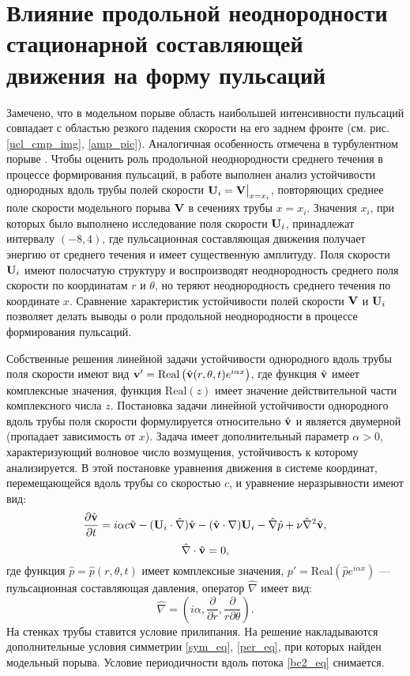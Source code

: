 \section{Влияние продольной неоднородности стационарной составляющей движения на форму пульсаций}

Замечено, что в модельном порыве область наибольшей интенсивности пульсаций совпадает с областью резкого падения скорости на его заднем фронте (см. рис. \ref{ucl_cmp_img}, \ref{amp_pic}). Аналогичная особенность отмечена в турбулентном порыве \cite{Hof2010}. Чтобы оценить роль продольной неоднородности среднего течения в процессе формирования пульсаций, в работе выполнен анализ устойчивости однородных вдоль трубы полей скорости $\mathbf{U}_i = \mathbf{V}\big|_{x=x_i}$, повторяющих среднее поле скорости модельного порыва $\mathbf{V}$ в сечениях трубы $x = x_i$. Значения $x_i$, при которых было выполнено исследование поля скорости $\mathbf{U}_i$, принадлежат интервалу $(-8,4)$, где пульсационная составляющая движения получает энергию от среднего течения и имеет существенную амплитуду. Поля скорости $\mathbf{U}_i$ имеют полосчатую структуру и воспроизводят неоднородность среднего поля скорости по координатам $r$ и $\theta$, но теряют неоднородность среднего течения по координате $x$. Сравнение характеристик устойчивости полей скорости $\mathbf{V}$ и $\mathbf{U}_i$ позволяет делать выводы о роли продольной неоднородности в процессе формирования пульсаций. 

Собственные решения линейной задачи устойчивости однородного вдоль трубы поля скорости имеют вид $\mathbf{v}' = \mathrm{Real}\left(\hat {\mathbf{v}} (r, \theta, t) e^{i \alpha x}\right)$, где функция $\hat {\mathbf{v}}$ имеет комплексные значения, функция $\mathrm{Real}(z)$ имеет значение действительной части комплексного числа $z$. Постановка задачи линейной устойчивости однородного вдоль трубы поля скорости формулируется относительно $\hat {\mathbf{v}}$ и является двумерной (пропадает зависимость от $x$). Задача имеет дополнительный параметр $\alpha > 0$, характеризующий волновое число возмущения, устойчивость к которому анализируется. В этой постановке уравнения движения в системе координат, перемещающейся вдоль трубы со скоростью $c$, и уравнение неразрывности имеют вид: 
\begin{equation} \label{hat_NS_eq}
\frac{\partial \hat {\mathbf{v}}}{\partial t} = i \alpha  c \hat {\mathbf{v}} - (\mathbf{U}_i \cdot \hat \nabla) \hat {\mathbf{v}} - (\hat {\mathbf{v}} \cdot \nabla) \mathbf{U}_i - \hat \nabla \hat p + \nu \hat \nabla^2 \hat {\mathbf{v}},
\end{equation}
\begin{equation} \label{hat_div_eq}
\hat \nabla \cdot \hat {\mathbf{v}} = 0,
\end{equation}
где функция $\hat p = \hat p(r,\theta,t)$ имеет комплексные значения, $p' = \mathrm{Real}\left(\hat p e^{i \alpha x}\right)$ --- пульсационная составляющая давления, оператор $\hat \nabla$ имеет вид: 
\begin{equation*}
\hat \nabla = \left( i\alpha, \frac{\partial}{\partial r}, \frac{\partial}{r \partial \theta} \right).
\end{equation*}
На стенках трубы ставится условие прилипания. На решение накладываются дополнительные условия симметрии \eqref{sym_eq}, \eqref{per_eq}, при которых найден модельный порыва. Условие периодичности вдоль потока \eqref{bc2_eq} снимается. 

